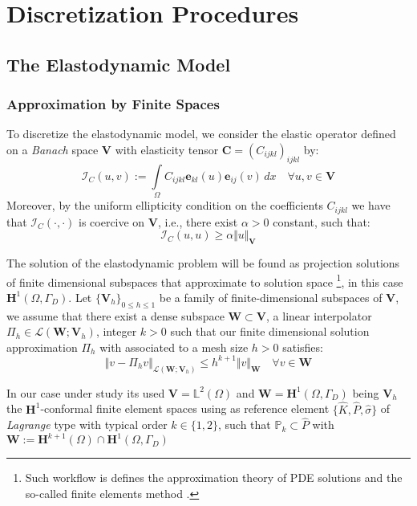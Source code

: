 \chapter{Discretization Procedures}



\section{The Elastodynamic Model}
\subsection{Approximation by Finite Spaces}
To discretize the elastodynamic model, we consider the elastic operator defined on a \textit{Banach} space $\mathbf{V}$ with elasticity tensor $\mathbf{C} = (C_{ijkl})_{ijkl}$ by:
\begin{equation*}
    \mathcal{I}_C (u,v) := \int \limits_{\Omega} C_{ijkl}\mathbf{e}_{kl}(u) \mathbf{e}_{ij}(v) \, dx \quad \forall u,v \in \mathbf{V}
\end{equation*}
Moreover, by the uniform ellipticity condition on the coefficients $C_{ijkl}$ we have that $\mathcal{I}_{C}(\cdot, \cdot)$ is coercive on $\mathbf{V}$, i.e., there exist $\alpha > 0$ constant, such that:
\begin{equation*}
    \mathcal{I}_C (u,u) \geq  \alpha \Vert u \Vert_{\mathbf{V}}
\end{equation*}

The solution of the elastodynamic problem will be found as projection solutions of finite dimensional subspaces that approximate to solution space \footnote{Such workflow is defines the approximation theory of PDE solutions and the so-called finite elements method \cite{ern2004theory}.}, in this case $\mathbf{H}^1(\Omega, \Gamma_D)$.
Let $\{\mathbf{V}_h \}_{0 \leq h \leq 1}$ be a family of finite-dimensional subspaces of $\mathbf{V}$, we assume that there exist a dense subspace $\mathbf{W} \subset \mathbf{V}$, a linear interpolator $\Pi_h \in \mathcal{L}(\mathbf{W};\mathbf{V}_h)$, integer $k > 0$ such that our finite dimensional solution approximation $\Pi_{h} $ with associated to a mesh size $h>0$ satisfies:
\begin{equation*}
    \Vert v - \Pi_h v \Vert_{\mathcal{L}(\mathbf{W};\mathbf{V}_h)} \leq h^{k+1} \Vert v \Vert_{\mathbf{W}} \quad \forall v \in \mathbf{W}
\end{equation*}
\begin{rem}
In our case under study its used $\mathbf{V} = \mathbb{L}^2(\Omega)$ and $\mathbf{W} = \mathbf{H}^1(\Omega, \Gamma_D)$ being $\mathbf{V}_h$ the $\mathbf{H}^1$-conformal finite element spaces using as reference element $\{ \hat{K}, \hat{P}, \hat{\sigma} \}$ of \textit{Lagrange} type with typical order $k \in \{1,2\}$, such that $\mathbb{P}_k \subset \hat{P}$ with $\mathbf{W} := \mathbf{H}^{k+1}(\Omega) \cap \mathbf{H}^1(\Omega, \Gamma_D)$
\end{rem}

